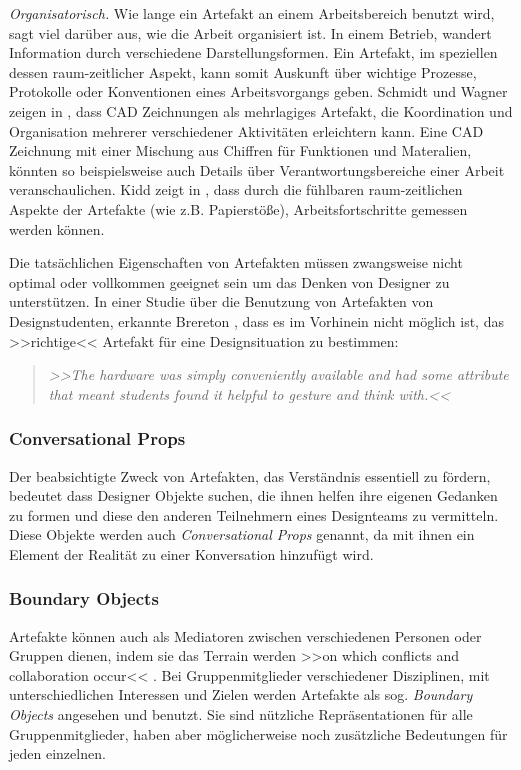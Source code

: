 \medskip \emph{Organisatorisch.} Wie lange ein Artefakt an einem Arbeitsbereich benutzt wird, sagt viel darüber aus, wie die Arbeit organisiert ist. In einem Betrieb, wandert Information durch verschiedene Darstellungsformen. Ein Artefakt, im speziellen dessen raum-zeitlicher Aspekt, kann somit Auskunft über wichtige Prozesse, Protokolle oder Konventionen eines Arbeitsvorgangs geben. Schmidt und Wagner zeigen in \citep{Schmidt:2002}, dass CAD Zeichnungen als mehrlagiges Artefakt, die Koordination und Organisation mehrerer verschiedener Aktivitäten erleichtern kann. Eine CAD Zeichnung mit einer Mischung aus Chiffren für Funktionen und Materalien, könnten so beispielsweise auch Details über Verantwortungsbereiche einer Arbeit veranschaulichen. Kidd zeigt in \citep{Kidd:1994}, dass durch die fühlbaren raum-zeitlichen Aspekte der Artefakte (wie z.B. Papierstöße), Arbeitsfortschritte gemessen werden können. \citep{Vyas:2008}

\bigskip Die tatsächlichen Eigenschaften von Artefakten müssen zwangsweise nicht optimal oder vollkommen geeignet sein um das Denken von Designer zu unterstützen. In einer Studie über die Benutzung von Artefakten von Designstudenten, erkannte Brereton \citep{Brereton:2000}, dass es im Vorhinein nicht möglich ist, das >>richtige<< Artefakt für eine Designsituation zu bestimmen:

\begin{quote}
	\textsl{>>The hardware was simply conveniently available and had some attribute that meant students found it helpful to gesture and think with.<<}
\begin{flushright}\citep{Brereton:2000}\end{flushright}
\end{quote}

\subsubsection{Conversational Props}
Der beabsichtigte Zweck von Artefakten, das Verständnis essentiell zu fördern, bedeutet dass Designer Objekte suchen, die ihnen helfen ihre eigenen Gedanken zu formen und diese den anderen Teilnehmern eines Designteams zu vermitteln. Diese Objekte werden auch \emph{Conversational Props} \citep{Brinck:1992} genannt, da mit ihnen ein Element der Realität zu einer Konversation hinzufügt wird. \citep{Larsson:2003}

\subsubsection{Boundary Objects}
Artefakte können auch als Mediatoren zwischen verschiedenen Personen oder Gruppen dienen, indem sie das Terrain werden >>on which conflicts and collaboration occur<< \citep{Perry:1998}. Bei Gruppenmitglieder verschiedener Disziplinen, mit unterschiedlichen Interessen und Zielen werden Artefakte als sog. \emph{Boundary Objects} \citep{Star:1989} angesehen und benutzt. Sie sind nützliche Repräsentationen für alle Gruppenmitglieder, haben aber möglicherweise noch zusätzliche Bedeutungen für jeden einzelnen. \citep{Larsson:2003}

